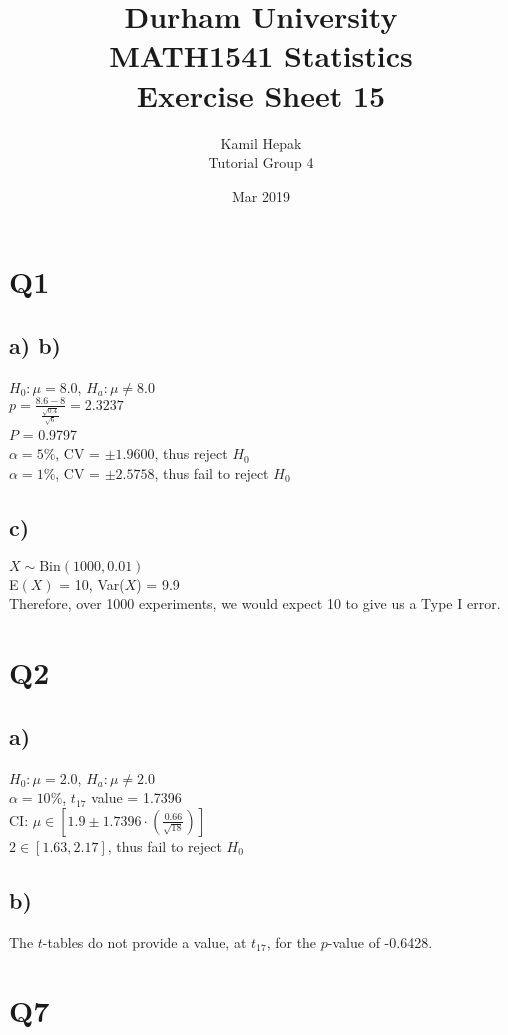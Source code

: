 \documentclass[]{article}
\title{\vspace{-3cm}Durham University\\
    MATH1541 Statistics \\
	Exercise Sheet 15}
\author{Kamil Hepak\\
        Tutorial Group 4}
\date{Mar 2019}
\begin{document}
\maketitle

\section{Q1}
\subsection{a) b)}
$H_0: \mu = 8.0$, $H_a: \mu \neq 8.0$
\\
$p = \frac{8.6-8}{\frac{\sqrt{0.4}}{\sqrt{6}}} = 2.3237$
\\
$P$ = 0.9797
\\
$\alpha = 5\%$, CV = $\pm 1.9600$, thus reject $H_0$
\\
$\alpha = 1\%$, CV = $\pm 2.5758$, thus fail to reject $H_0$

\subsection{c)}
$X \sim \textrm{Bin}(1000, 0.01)$
\\
E$(X)$ = 10, Var($X$) = 9.9
\\
Therefore, over 1000 experiments, we would expect 10 to give us a Type I error.

\section{Q2}
\subsection{a)}
$H_0: \mu = 2.0$, $H_a: \mu \neq 2.0$
\\
$\alpha = 10\%$, $t_{17}$ value = 1.7396
\\ 
CI: $\mu \in [1.9 \pm 1.7396\cdot \left( \frac{0.66}{\sqrt{18}} \right)]$
\\
$2 \in [1.63, 2.17]$, thus fail to reject $H_0$

\subsection{b)}
The $t$-tables do not provide a value, at $t_{17}$, for the $p$-value of -0.6428.

\section{Q7}
\end{document}
